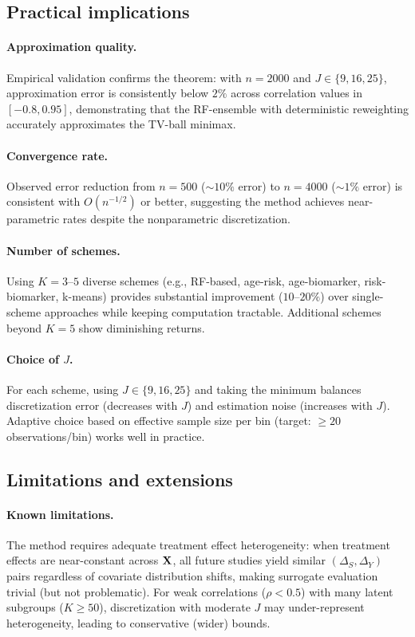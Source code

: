 \documentclass{article}
\begin{document}
\subsection{Practical implications}

\paragraph{Approximation quality.}
Empirical validation confirms the theorem: with $n = 2000$ and $J \in \{9, 16, 25\}$, approximation error is consistently below $2\%$ across correlation values in $[-0.8, 0.95]$, demonstrating that the RF-ensemble with deterministic reweighting accurately approximates the TV-ball minimax.

\paragraph{Convergence rate.}
Observed error reduction from $n = 500$ ($\sim 10\%$ error) to $n = 4000$ ($\sim 1\%$ error) is consistent with $O(n^{-1/2})$ or better, suggesting the method achieves near-parametric rates despite the nonparametric discretization.

\paragraph{Number of schemes.}
Using $K = 3$--$5$ diverse schemes (e.g., RF-based, age-risk, age-biomarker, risk-biomarker, k-means) provides substantial improvement ($10$--$20\%$) over single-scheme approaches while keeping computation tractable. Additional schemes beyond $K = 5$ show diminishing returns.

\paragraph{Choice of $J$.}
For each scheme, using $J \in \{9, 16, 25\}$ and taking the minimum balances discretization error (decreases with $J$) and estimation noise (increases with $J$). Adaptive choice based on effective sample size per bin (target: $\geq 20$ observations/bin) works well in practice.

\subsection{Limitations and extensions}

\paragraph{Known limitations.}
The method requires adequate treatment effect heterogeneity: when treatment effects are near-constant across $\mathbf{X}$, all future studies yield similar $(\Delta_S, \Delta_Y)$ pairs regardless of covariate distribution shifts, making surrogate evaluation trivial (but not problematic). For weak correlations ($\rho < 0.5$) with many latent subgroups ($K \geq 50$), discretization with moderate $J$ may under-represent heterogeneity, leading to conservative (wider) bounds.
\end{document}
